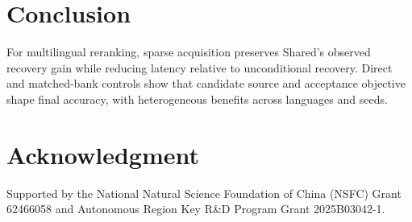\documentclass[conference,letterpaper]{IEEEtran}
\begin{document}
\section{Conclusion}
For multilingual reranking, sparse acquisition preserves Shared's observed recovery gain while reducing latency relative to unconditional recovery. Direct and matched-bank controls show that candidate source and acceptance objective shape final accuracy, with heterogeneous benefits across languages and seeds.
\section*{Acknowledgment}
Supported by the National Natural Science Foundation of China (NSFC) Grant 62466058 and Autonomous Region Key R\&D Program Grant 2025B03042-1.
\label{iscas:body-end}\clearpage\balance
\label{iscas:references-start}

\end{document}
